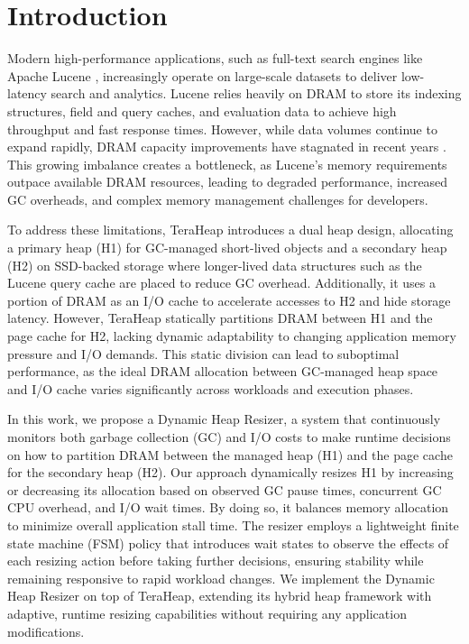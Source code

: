 \section{Introduction}

%
Modern high-performance applications, such as full-text search engines like Apache Lucene 
\cite{lucene_dimitris}, increasingly operate on large-scale datasets to deliver low-latency 
search and analytics. Lucene relies heavily on DRAM to store its indexing structures, field 
and query caches, and evaluation data to achieve high throughput and fast response times. 
However, while data volumes continue to expand rapidly, DRAM capacity improvements have stagnated 
in recent years \cite{DAOS, Borg}. This growing imbalance creates a bottleneck, as Lucene’s memory 
requirements outpace available DRAM resources, leading to degraded performance, increased GC overheads, 
and complex memory management challenges for developers.

To address these limitations, TeraHeap \cite{TeraHeap} introduces a dual heap design,
allocating a primary heap (H1) for GC-managed short-lived objects and a secondary heap (H2) on 
SSD-backed storage where longer-lived data structures such as the Lucene query cache are placed to reduce GC overhead. 
Additionally, it uses a portion of DRAM as an I/O cache to accelerate accesses to H2 and hide storage latency. However, TeraHeap statically partitions 
DRAM between H1 and the page cache for H2, lacking dynamic adaptability to changing application memory pressure 
and I/O demands. This static division can lead to suboptimal performance, as the ideal DRAM allocation between GC-managed
heap space and I/O cache varies significantly across workloads and execution phases.

In this work, we propose a Dynamic Heap Resizer, a system that continuously monitors both garbage collection 
(GC) and I/O costs to make runtime decisions on how to partition DRAM between the managed heap (H1) and the 
page cache for the secondary heap (H2). Our approach dynamically resizes H1 by increasing or decreasing its 
allocation based on observed GC pause times, concurrent GC CPU overhead, and I/O wait times. By doing so, it 
balances memory allocation to minimize overall application stall time. The resizer employs a lightweight finite 
state machine (FSM) policy that introduces wait states to observe the effects of each resizing action before taking 
further decisions, ensuring stability while remaining responsive to rapid workload changes. We implement the Dynamic 
Heap Resizer on top of TeraHeap, extending its hybrid heap framework with adaptive, runtime resizing capabilities without
requiring any application modifications.

